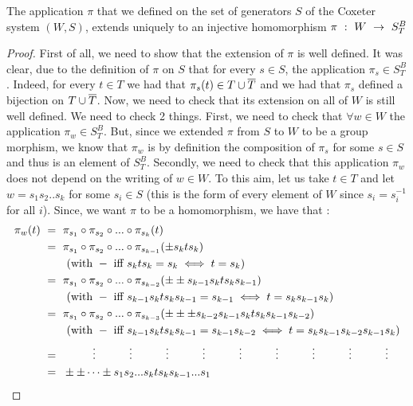 
	\begin{theorem}
		The application $\pi$ that we defined on the set of generators $S$ of the Coxeter system $(W,S)$, extends uniquely to an injective homomorphism $\pi\text{ }:\text{ } W\text{ }\rightarrow\text{ } S^B_T$
	\end{theorem}
	\begin{proof}
		First of all, we need to show that the extension of $\pi$ is well defined. It was clear, due to the definition of $\pi$ on $S$ that for every $s\in S$, the application $\pi_s\in S^B_T$. Indeed, for every $t\in T$ we had that $\pi_s(t)\in T\cup \overline{T}$ and we had that $\pi_s$ defined a bijection on $T\cup \overline{T}$. Now, we need to check that its extension on all of $W$ is still well defined. We need to check 2 things. First, we need to check that $\forall w\in W$ the application $\pi_w\in S_T^B$. But, since we extended $\pi$ from $S$ to $W$ to be a group morphism, we know that $\pi_w$ is by definition the composition of $\pi_s$ for some $s\in S$ and thus is an element of $S_T^B$. Secondly, we need to check that this application $\pi_w$ does not depend on the writing of $w\in W$. To this aim, let us take $t\in T$ and let $w=s_1s_2..s_k$ for some $s_i\in S$ (this is the form of every element of $W$ since $s_i=s_i^{-1}$ for all $i$). Since, we want $\pi$ to be a homomorphism, we have that :
		\begin{equation}\label{equation donnant la form explicite de pi}
		\begin{split}
		\pi_w(t)\qq&=\qq \pi_{s_1}\circ\pi_{s_2}\circ ... \circ \pi_{s_k}(t)\\
		&=\qq \pi_{s_1}\circ\pi_{s_2}\circ ... \circ \pi_{s_{k-1}}(\pm s_kts_k)\q\q\\
		& \q\q (\mbox{with }-\mbox{ iff }s_kts_k=s_k\iff t=s_k)\\
		&=\qq \pi_{s_1}\circ\pi_{s_2}\circ ... \circ \pi_{s_{k-2}}(\pm\pm s_{k-1}s_kts_ks_{k-1})\q\q\\
		& \q\q(\mbox{with }-\mbox{ iff }s_{k-1}s_kts_ks_{k-1}=s_{k-1}\iff t=s_ks_{k-1}s_k)\\
		&=\qq \pi_{s_1}\circ\pi_{s_2}\circ ... \circ \pi_{s_{k-3}}(\pm\pm\pm s_{k-2}s_{k-1}s_kts_ks_{k-1}s_{k-2})\q\q \\
		&\q\q (\mbox{with }-\mbox{ iff }s_{k-1}s_kts_ks_{k-1}=s_{k-1}s_{k-2}\iff t=s_ks_{k-1}s_{k-2}s_{k-1}s_k)\\
		&=\q\q \q\vdots\q\q \q\vdots\q\q \q\vdots\q\q \q\vdots\q\q \q\vdots\q\q \q\vdots\q\q \q\vdots\q\q \q\vdots\q\q \q\vdots\\
		&=\qq \pm\pm \dots \pm s_1s_2...s_kts_ks_{k-1}... s_1\q\q\\

\end{split}
\end{equation}
\end{proof}
